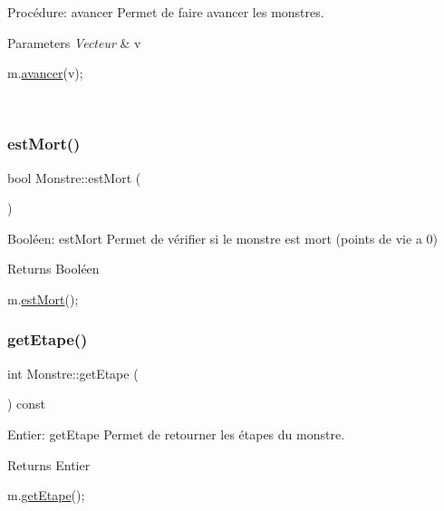 Procédure\+: avancer Permet de faire avancer les monstres. 


\begin{DoxyParams}{Parameters}
{\em Vecteur} & v 
\begin{DoxyCode}
m.\hyperlink{classMonstre_a5fed7574a7a621251d313219c0831b09}{avancer}(v);
\end{DoxyCode}
 \\
\hline
\end{DoxyParams}
\mbox{\label{classMonstre_aebc60bc5dfa1353663ba975c589dc2e3}} 
\subsubsection{\texorpdfstring{est\+Mort()}{estMort()}}
{\footnotesize\ttfamily bool Monstre\+::est\+Mort (\begin{DoxyParamCaption}{ }\end{DoxyParamCaption})}



Booléen\+: est\+Mort Permet de vérifier si le monstre est mort (points de vie a 0) 

\begin{DoxyReturn}{Returns}
Booléen 
\begin{DoxyCode}
m.\hyperlink{classMonstre_aebc60bc5dfa1353663ba975c589dc2e3}{estMort}();
\end{DoxyCode}
 
\end{DoxyReturn}
\mbox{\label{classMonstre_a255b98ed4faab15ecd13a315414a5b94}} 
\subsubsection{\texorpdfstring{get\+Etape()}{getEtape()}}
{\footnotesize\ttfamily int Monstre\+::get\+Etape (\begin{DoxyParamCaption}{ }\end{DoxyParamCaption}) const}



Entier\+: get\+Etape Permet de retourner les étapes du monstre. 

\begin{DoxyReturn}{Returns}
Entier 
\begin{DoxyCode}
m.\hyperlink{classMonstre_a255b98ed4faab15ecd13a315414a5b94}{getEtape}();
\end{DoxyCode}
 
\end{DoxyReturn}
\mbox{\label{classMonstre_a4a71cce5e0825e0e331bfdd3538a9b30}} 
